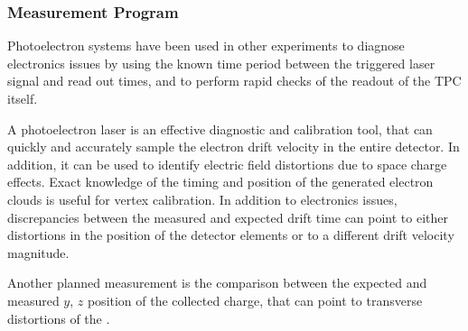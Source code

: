 \subsubsection{Measurement Program}
\label{sec:sp-calib-sys-las-pe-meas} 

Photoelectron systems have been used in other experiments to diagnose electronics issues by using the known time period between the triggered laser signal and read out times, and to perform rapid checks of the readout of the TPC itself. 

A photoelectron laser is an effective diagnostic and calibration tool, that can quickly and accurately sample the electron drift velocity in the entire detector.
In addition, it can be used to identify electric field distortions due to space charge effects. Exact knowledge of the timing and position of the generated electron clouds is useful for vertex calibration.
In addition to electronics issues, discrepancies between the measured and expected drift time can point to either distortions in the position of the detector elements or to a different drift velocity magnitude. 

Another planned measurement is the comparison between the expected and measured $y$, $z$ position of the collected charge, that can point to transverse distortions of the \efield.




